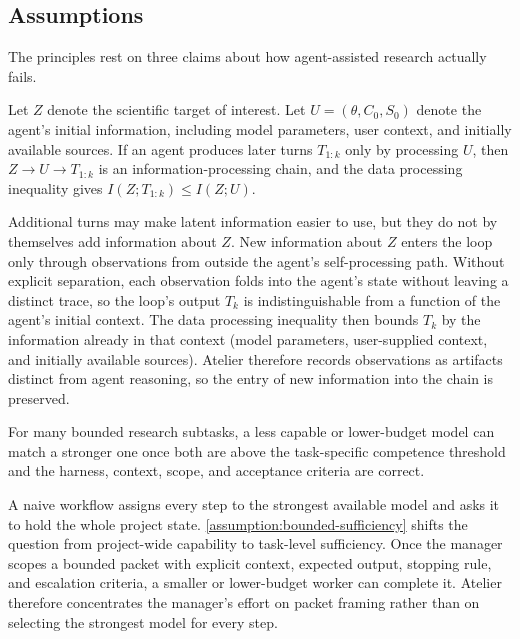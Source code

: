\subsection{Assumptions}

The principles rest on three claims about how agent-assisted research actually fails.

\begin{assumption}
\label{assumption:info-flow}
Let $Z$ denote the scientific target of interest. Let $U=(\theta, C_0, S_0)$ denote the agent's initial information, including model parameters, user context, and initially available sources. If an agent produces later turns $T_{1:k}$ only by processing $U$, then $Z \rightarrow U \rightarrow T_{1:k}$ is an information-processing chain, and the data processing inequality gives $I(Z; T_{1:k}) \leq I(Z; U)$.
\end{assumption}

Additional turns may make latent information easier to use, but they do not by themselves add information about $Z$. New information about $Z$ enters the loop only through observations from outside the agent's self-processing path. Without explicit separation, each observation folds into the agent's state without leaving a distinct trace, so the loop's output $T_k$ is indistinguishable from a function of the agent's initial context. The data processing inequality then bounds $T_k$ by the information already in that context (model parameters, user-supplied context, and initially available sources). Atelier therefore records observations as artifacts distinct from agent reasoning, so the entry of new information into the chain is preserved.

\begin{assumption}
\label{assumption:bounded-sufficiency}
For many bounded research subtasks, a less capable or lower-budget model can match a stronger one once both are above the task-specific competence threshold and the harness, context, scope, and acceptance criteria are correct.
\end{assumption}

A naive workflow assigns every step to the strongest available model and asks it to hold the whole project state. \cref{assumption:bounded-sufficiency} shifts the question from project-wide capability to task-level sufficiency. Once the manager scopes a bounded packet with explicit context, expected output, stopping rule, and escalation criteria, a smaller or lower-budget worker can complete it. Atelier therefore concentrates the manager's effort on packet framing rather than on selecting the strongest model for every step.

